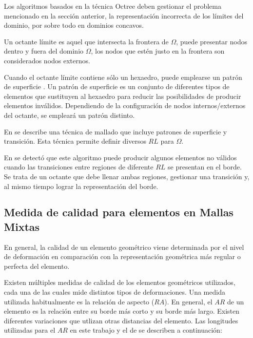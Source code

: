 
Los algoritmos basados en la técnica Octree deben gestionar el problema mencionado en la sección anterior, la representación incorrecta de los límites del dominio, por sobre todo en dominios concavos.

Un octante límite es aquel que intersecta la frontera de $\Omega$, puede presentar nodos dentro y fuera del dominio $\Omega$, los nodos que estén justo en la frontera son considerados nodos externos.

Cuando el octante límite contiene sólo un hexaedro, puede emplearse un patrón de superficie \cite{Gonzalez2014}. Un patrón de superficie es un conjunto de diferentes tipos de elementos que sustituyen al hexaedro para reducir las posibilidades de producir elementos inválidos. Dependiendo de la configuración de nodos internos/externos del octante, se empleará un patrón distinto.

En \cite{lobos2015mixed} se describe una técnica de mallado que incluye patrones de superficie y transición. Esta técnica permite definir diversos $RL$ para $\Omega$. 

En \cite{daines2018repairing} se detectó que este algoritmo puede producir algunos elementos no válidos cuando las transiciones entre regiones de diferente $RL$ se presentan en el borde. Se trata de un octante que debe llenar ambas regiones, gestionar una transición y, al mismo tiempo lograr la representación del borde. 

\subsection{Medida de calidad para elementos en Mallas Mixtas}

En general, la calidad de un elemento geométrico viene determinada por el nivel de deformación en comparación con la representación geométrica más regular o perfecta del elemento.  




Existen múltiples medidas de calidad de los elementos geométricos utilizados, cada una de las cuales mide distintos tipos de deformaciones.
Una medida utilizada habitualmente es la relación de aspecto ($RA$). En general, el $AR$ de un elemento es la relación entre su borde más corto y su borde más largo. Existen diferentes variaciones que utlizan otras distancias del elemento. Las longitudes utilizadas para el $AR$ en este trabajo y el de \cite{daines2018repairing} se describen a continuación:

